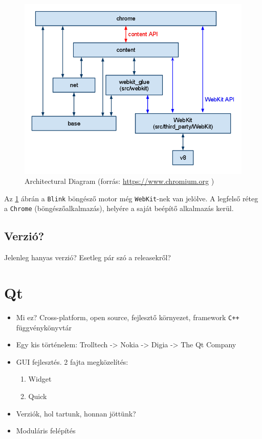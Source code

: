 \documentclass[12pt]{report}
\let\origurl\url
\renewcommand{\url}[1]{%
    \textcolor{blue}{\origurl{#1}}
}
\begin{document}
\begin{figure}[h]
    \centering
    \includegraphics[scale=0.6]{chromium_architecture}
    \caption{
        \label{fig-chromium-architecture}
        Architectural Diagram
        (forrás: \url{https://www.chromium.org} \cite{bib-chromium-content-module})
    }
\end{figure}

Az \ref{fig-chromium-architecture} ábrán a \texttt{Blink} böngésző motor még
\texttt{WebKit}-nek van jelölve.
A legfelső réteg a \texttt{Chrome} (böngészőalkalmazás), helyére a saját beépítő alkalmazás
kerül.

\subsection{Verzió?}
Jelenleg hanyas verzió? Esetleg pár szó a releasekről?


\section{Qt}
\begin{itemize}
    \item Mi ez?
        \subitem Cross-platform, open source, fejlesztő környezet, framework
        \subitem \texttt{C++} függvénykönyvtár
    \item Egy kis történelem:
        \subitem Trolltech -> Nokia -> Digia -> The Qt Company
    \item GUI fejlesztés. 2 fajta megközelítés:
        \begin{enumerate}
            \item Widget
            \item Quick
        \end{enumerate}
    \item Verziók, hol tartunk, honnan jöttünk?
    \item Moduláris felépítés
\end{itemize}
\end{document}
